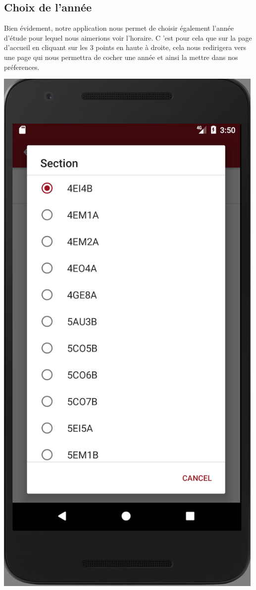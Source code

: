 \documentclass{article}
\begin{document}
            \subsection{Choix de l'ann\'ee}
	Bien évidement, notre application nous permet de choisir \'egalement l'ann\'ee d'\'etude pour lequel nous aimerions voir l'horaire. C 'est pour cela que sur la page d'accueil en  cliquant sur les 3 points  en haute \`a droite, cela nous redirigera vers une page qui nous permettra de cocher une ann\'ee et ainsi la mettre dans nos pr\'eferences.
        \begin{center}
            \includegraphics[scale=0.4]{img/Annee.png}
        \end{center}
\end{document}
